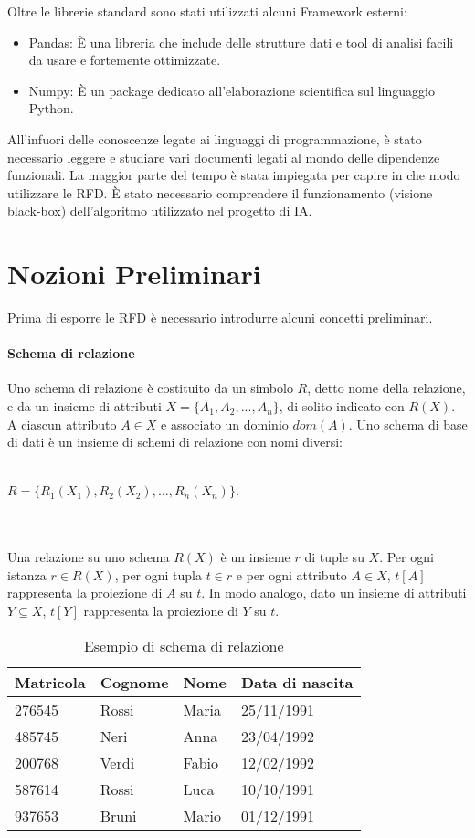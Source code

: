 Oltre le librerie standard sono stati utilizzati alcuni Framework esterni: 
\begin{itemize}
\item Pandas: È una libreria che include delle strutture dati e tool di analisi facili da usare e fortemente ottimizzate. 
\item Numpy: È un package dedicato all'elaborazione scientifica sul linguaggio Python.
\end{itemize}
All'infuori delle conoscenze legate ai linguaggi di programmazione, è stato necessario leggere e studiare vari documenti legati al mondo delle dipendenze funzionali. La maggior parte del tempo è stata impiegata per capire in che modo utilizzare le RFD. 
È stato necessario comprendere il funzionamento (visione black-box) dell’algoritmo utilizzato nel progetto di IA. 

\section{Nozioni Preliminari}
Prima di esporre le RFD è necessario introdurre alcuni concetti preliminari.

\paragraph{Schema di relazione}
Uno schema di relazione è costituito da un simbolo $R$, detto nome della relazione, e da un insieme di attributi $X = \{A_1,A_2,...,A_n\}$, di solito indicato
con $R(X)$. A ciascun attributo $A \in X$ e associato un dominio $dom(A)$.
Uno schema di base di dati è un insieme di schemi di relazione con nomi
diversi:
\\~\\
\centerline{$R = \{ R_1(X_1),R_2(X_2),\ldots,R_n(X_n)\}$.}
\\~\\
Una relazione su uno schema $R(X)$ è un insieme $r$ di tuple su $X$. Per
ogni istanza $r \in R(X)$, per ogni tupla $t \in r$ e per ogni attributo $A \in X$,
$t[A]$ rappresenta la proiezione di $A$ su $t$. In modo analogo, dato un insieme
di attributi $Y \subseteq X$, $t[Y]$ rappresenta la proiezione di $Y$ su $t$.\cite{libroCeri}


\begin{table}[H]
    \centering
    \begin{tabular}{ | l | l | l | l |}
        \hline
        Matricola & Cognome & Nome & Data di nascita\\
        \hline
        276545 & Rossi & Maria & 25/11/1991 \\ 
        485745 & Neri & Anna & 23/04/1992 \\ 
        200768 & Verdi & Fabio & 12/02/1992 \\
        587614 & Rossi & Luca & 10/10/1991 \\
        937653 & Bruni & Mario & 01/12/1991 \\
        \hline
    \end{tabular}
    \caption{Esempio di schema di relazione}
    \label{tab:table example}
\end{table}

